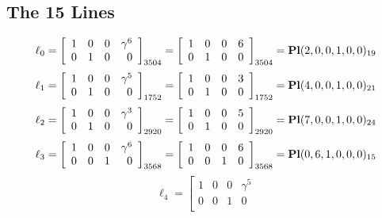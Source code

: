 \documentclass{article}
\begin{document}
{\subsection*{The 15 Lines}
$$
\ell_{0} = 
\left[
\begin{array}{*{4}{r}}
1 & 0 & 0 & \gamma^{6}\\
0 & 1 & 0 & 0\\
\end{array}
\right]
_{3504}
=
\left[
\begin{array}{*{4}c}
1  & 0  & 0  & 6\\
0  & 1  & 0  & 0\\
\end{array}
\right]_{3504}
={\rm\bf Pl}(2,0,0,1,0,0 )_{19}$$
$$
\ell_{1} = 
\left[
\begin{array}{*{4}{r}}
1 & 0 & 0 & \gamma^{5}\\
0 & 1 & 0 & 0\\
\end{array}
\right]
_{1752}
=
\left[
\begin{array}{*{4}c}
1  & 0  & 0  & 3\\
0  & 1  & 0  & 0\\
\end{array}
\right]_{1752}
={\rm\bf Pl}(4,0,0,1,0,0 )_{21}$$
$$
\ell_{2} = 
\left[
\begin{array}{*{4}{r}}
1 & 0 & 0 & \gamma^{3}\\
0 & 1 & 0 & 0\\
\end{array}
\right]
_{2920}
=
\left[
\begin{array}{*{4}c}
1  & 0  & 0  & 5\\
0  & 1  & 0  & 0\\
\end{array}
\right]_{2920}
={\rm\bf Pl}(7,0,0,1,0,0 )_{24}$$
$$
\ell_{3} = 
\left[
\begin{array}{*{4}{r}}
1 & 0 & 0 & \gamma^{6}\\
0 & 0 & 1 & 0\\
\end{array}
\right]
_{3568}
=
\left[
\begin{array}{*{4}c}
1  & 0  & 0  & 6\\
0  & 0  & 1  & 0\\
\end{array}
\right]_{3568}
={\rm\bf Pl}(0,6,1,0,0,0 )_{15}$$
$$
\ell_{4} = 
\left[
\begin{array}{*{4}{r}}
1 & 0 & 0 & \gamma^{5}\\
0 & 0 & 1 & 0\\

\end{array}$$}
\end{document}
